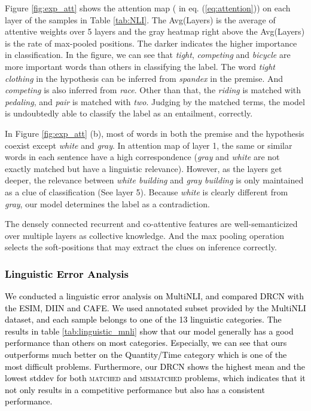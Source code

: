 \documentclass[letterpaper]{article} \usepackage{aaai19}  \usepackage{times}  \usepackage{helvet}  \usepackage{courier}  \usepackage{url}  \usepackage{graphicx}  \frenchspacing  \setlength{\pdfpagewidth}{8.5in}  \setlength{\pdfpageheight}{11in}
\newcommand\sh[1]{\textcolor{black}{#1}}
\newcommand\nj[1]{\textcolor{black}{#1}}
\begin{document}
Figure \ref{fig:exp_att} shows the attention map ( in eq. (\ref{eq:attention})) on each layer of the samples in Table \ref{tab:NLI}. The Avg(Layers) is the average of attentive weights over 5 layers and the gray heatmap right above the Avg(Layers) is the rate of max-pooled positions. The darker indicates the higher importance in classification. In the figure, we can see that \textit{tight}, \textit{competing} and \textit{bicycle} are more important words than others in classifying the label. The word \textit{tight clothing} in the hypothesis can be inferred from \textit{spandex} in the premise. And \textit{competing} is also inferred from \textit{race}. 
Other than that, the \textit{riding} is matched with \textit{pedaling}, and \textit{pair} is matched with \textit{two}. Judging by the matched terms, the model is undoubtedly able to classify the label as an entailment, correctly.

In Figure \ref{fig:exp_att} (b), most of words in both the premise and the hypothesis coexist except \textit{white} and \textit{gray}. In attention map of layer 1, the same or similar words in each sentence have a high correspondence (\textit{gray} and \textit{white} are not exactly matched but have a linguistic relevance). However, as the layers get deeper, the relevance between \textit{white building} and \textit{gray building} is only maintained as a clue of classification (See layer 5). Because \textit{white} is clearly different from \textit{gray}, our model determines the label as a contradiction.

The densely connected recurrent and co-attentive features are well-semanticized over multiple layers as collective knowledge. And the max pooling operation selects the soft-positions that may extract the clues on inference correctly.


\subsubsection{\sh{Linguistic Error Analysis}}
\sh{We conducted a linguistic error analysis on MultiNLI, and compared DRCN with the ESIM, DIIN and CAFE. We used annotated subset provided by the MultiNLI dataset, and each sample belongs to one of the 13 linguistic categories. The results in table \ref{tab:linguistic_mnli} show that our model generally has a good performance than others on most categories. Especially, we can see that ours outperforms much better on the Quantity/Time category which is one of the most difficult problems. Furthermore, \nj{our DRCN shows the highest mean and the lowest stddev for both \textsc{matched} and \textsc{mismatched} problems, which indicates that it not only results in a competitive performance but also has a consistent performance.}}
\end{document}
